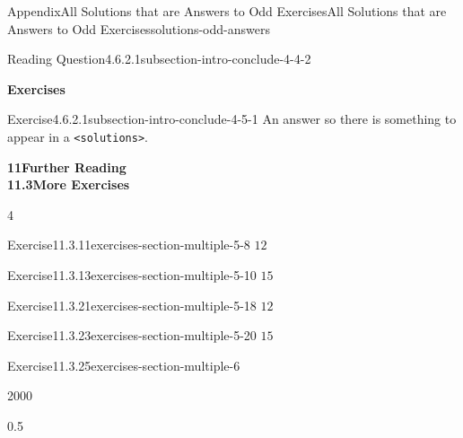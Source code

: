 \documentclass[twoside,10pt,]{article}
\newcommand{\tabularfont}{\relax}
\newcommand{\mono}[1]{\texttt{#1}}
\numberwithin{equation}{section}
\newcommand{\hrulemedium}{\noalign{\hrule height 0.07em}}
\begin{document}
\begin{solutions-section}{Appendix}{All Solutions that are Answers to Odd Exercises}{}{All Solutions that are Answers to Odd Exercises}{}{}{solutions-odd-answers}
\begin{divisionsolution}{Reading Question}{4.6.2.1}{}{subsection-intro-conclude-4-4-2}
\end{divisionsolution}%
\par\medskip
\noindent\textbf{\normalsize{}\textperiodcentered\space{}Exercises}
\begin{divisionsolution}{Exercise}{4.6.2.1}{}{subsection-intro-conclude-4-5-1}%
\noindent\hypertarget{subsection-intro-conclude-4-5-1-2-back}{}An answer so there is something to appear in a \mono{<solutions>}.%
\end{divisionsolution}%
\par\medskip
\noindent\textbf{\large{}11\space\textperiodcentered\space{}Further Reading\\
11.3\space\textperiodcentered\space{}More Exercises}
\begin{exercisegroupcol}{4}
\begin{divisionsolutionegcol}{Exercise}{11.3.11}{}{exercises-section-multiple-5-8}%
\noindent\hypertarget{exercises-section-multiple-5-8-3-back}{}\(12\)%
\end{divisionsolutionegcol}%
\begin{divisionsolutionegcol}{Exercise}{11.3.13}{}{exercises-section-multiple-5-10}%
\noindent\hypertarget{exercises-section-multiple-5-10-2-back}{}\(15\)%
\end{divisionsolutionegcol}%
\begin{divisionsolutionegcol}{Exercise}{11.3.21}{}{exercises-section-multiple-5-18}%
\noindent\hypertarget{exercises-section-multiple-5-18-3-back}{}\(12\)%
\end{divisionsolutionegcol}%
\begin{divisionsolutionegcol}{Exercise}{11.3.23}{}{exercises-section-multiple-5-20}%
\noindent\hypertarget{exercises-section-multiple-5-20-2-back}{}\(15\)%
\end{divisionsolutionegcol}%
\end{exercisegroupcol}
\par\medskip\noindent
\begin{divisionsolution}{Exercise}{11.3.25}{}{exercises-section-multiple-6}%
\noindent\hypertarget{exercises-section-multiple-6-2-back}{}\begin{sidebyside}{2}{0}{0}{0}%
\begin{sbspanel}{0.5}%
\noindent\resizebox{\ifdim\width > \linewidth\linewidth\else\width\fi}{!}{%
{\centering%
{\tabularfont%
\begin{tabular}{cc}
{\bfseries{}\(x\)}&{\bfseries{}\(f(x)\)}\tabularnewline\hrulemedium
\(0\)&\(0\)\tabularnewline[0pt]
\(1\)&\(1\)\tabularnewline[0pt]
\(2\)&\(4\)\tabularnewline[0pt]

\end{tabular}}}}
\end{sbspanel}
\end{sidebyside}
\end{divisionsolution}
\end{solutions-section}
\end{document}
